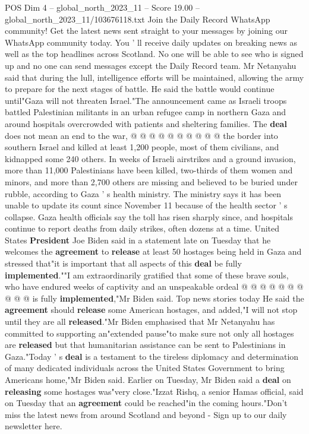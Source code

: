 \begin{textsample}{POS Dim 4 – global\_north\_2023\_11 – Score 19.00 – global\_north\_2023\_11/103676118.txt}
Join the Daily Record WhatsApp community!
Get the latest news sent straight to your messages by joining our WhatsApp community today.
You ' ll receive daily updates on breaking news as well as the top headlines across Scotland.
No one will be able to see who is signed up and no one can send messages except the Daily Record team.
Mr Netanyahu said that during the lull, intelligence efforts will be maintained, allowing the army to prepare for the next stages of battle.
He said the battle would continue until"Gaza will not threaten Israel."The announcement came as Israeli troops battled Palestinian militants in an urban refugee camp in northern Gaza and around hospitals overcrowded with patients and sheltering families.
The \textbf{deal} does not mean an end to the war, @ @ @ @ @ @ @ @ @ @ the border into southern Israel and killed at least 1,200 people, most of them civilians, and kidnapped some 240 others.
In weeks of Israeli airstrikes and a ground invasion, more than 11,000 Palestinians have been killed, two-thirds of them women and minors, and more than 2,700 others are missing and believed to be buried under rubble, according to Gaza ' s health ministry.
The ministry says it has been unable to update its count since November 11 because of the health sector ' s collapse.
Gaza health officials say the toll has risen sharply since, and hospitals continue to report deaths from daily strikes, often dozens at a time.
United States \textbf{President} Joe Biden said in a statement late on Tuesday that he welcomes the \textbf{agreement} to \textbf{release} at least 50 hostages being held in Gaza and stressed that"it is important that all aspects of this \textbf{deal} be fully \textbf{implemented}.""I am extraordinarily gratified that some of these brave souls, who have endured weeks of captivity and an unspeakable ordeal @ @ @ @ @ @ @ @ @ @ is fully \textbf{implemented},"Mr Biden said.
Top news stories today He said the \textbf{agreement} should \textbf{release} some American hostages, and added,"I will not stop until they are all \textbf{released}."Mr Biden emphasised that Mr Netanyahu has committed to supporting an"extended pause"to make sure not only all hostages are \textbf{released} but that humanitarian assistance can be sent to Palestinians in Gaza."Today ' s \textbf{deal} is a testament to the tireless diplomacy and determination of many dedicated individuals across the United States Government to bring Americans home,"Mr Biden said.
Earlier on Tuesday, Mr Biden said a \textbf{deal} on \textbf{releasing} some hostages was"very close."Izzat Rishq, a senior Hamas official, said on Tuesday that an \textbf{agreement} could be reached"in the coming hours."Don't miss the latest news from around Scotland and beyond - Sign up to our daily newsletter here.

\end{textsample}
